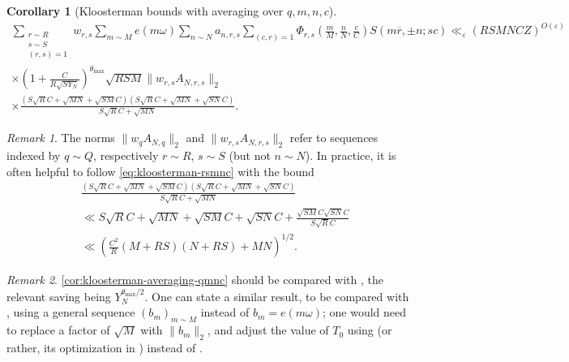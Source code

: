 \documentclass[reqno,11pt]{amsart}
\newtheorem{corollary}[theorem]{Corollary}
\theoremstyle{remark}
\newtheorem*{remark}{Remark}
\numberwithin{equation}{section}
\newcommand{\eps}{\varepsilon}
\renewcommand{\bar}{\overline}
\begin{document}
\begin{corollary}[Kloosterman bounds with averaging over $q, m, n, c$]
\begin{equation} \label{eq:kloosterman-rsmnc}
\begin{aligned}
    \sum_{\substack{r \sim R \\ s \sim S \\ (r, s) = 1}} w_{r,s} \sum_{m \sim M} e(m\omega)
    \sum_{n \sim N} a_{n,r,s}
    \sum_{(c, r) = 1} \Phi_{r,s}\left(\frac{m}{M}, \frac{n}{N}, \frac{c}{C}\right) S(m\bar{r}, \pm n; sc)
    \ll_\eps
    (RSMNCZ)^{O(\eps)}
    \\
    \times 
    \left(1 + \frac{C}{R \sqrt{S Y_N}}\right)^{\theta_{\max}} 
    \sqrt{RSM} \|w_{r,s} A_{N,r,s}\|_2
    \\
    \times
    \frac{\left(S\sqrt{R}C + \sqrt{MN} + \sqrt{SM} C\right)\left(S\sqrt{R}C + \sqrt{MN} + \sqrt{SN} C\right)}{S\sqrt{R}C + \sqrt{MN}}.
\end{aligned}
\end{equation}
\end{corollary}

\begin{remark}
The norms $\|w_q A_{N,q}\|_2$ and $\|w_{r,s} A_{N,r,s}\|_2$ refer to sequences indexed by $q \sim Q$, respectively $r \sim R$, $s \sim S$ (but not $n \sim N$).
In practice, it is often helpful to follow \cref{eq:kloosterman-rsmnc} with the bound
\begin{equation} \label{eq:Kloosterman-follow-up}
\begin{aligned} 
    &\frac{\left(S\sqrt{R}C + \sqrt{MN} + \sqrt{SM} C\right)\left(S\sqrt{R}C + \sqrt{MN} + \sqrt{SN} C\right)}{S\sqrt{R}C + \sqrt{MN}}
    \\
    &\ll 
    S\sqrt{R}C + \sqrt{MN} + \sqrt{SM}C + \sqrt{SN}C + \frac{\sqrt{SM} C \sqrt{SN} C}{S\sqrt{R} C}
    \\
    &\ll 
    \left(\frac{C^2}{R} (M + RS)(N + RS) + MN \right)^{1/2}.
\end{aligned}
\end{equation}
\end{remark}

\begin{remark}
\cref{cor:kloosterman-averaging-qmnc} should be compared with \cite[Theorem 11]{deshouillers1982kloosterman}, the relevant saving being $Y_N^{\theta_{\max}/2}$. One can state a similar result, to be compared with \cite[Theorem 10]{deshouillers1982kloosterman}, using a general sequence $(b_m)_{m \sim M}$ instead of $b_m = e(m\omega)$; one would need to replace a factor of $\sqrt{M}$ with $\|b_m\|_2$, and adjust the value of $T_0$ using \cite[Theorem 6]{deshouillers1982kloosterman} (or rather, its optimization in \cite{lichtman2023primes}) instead of \cite[Theorem 7]{deshouillers1982kloosterman}.
\end{remark}
\end{document}
